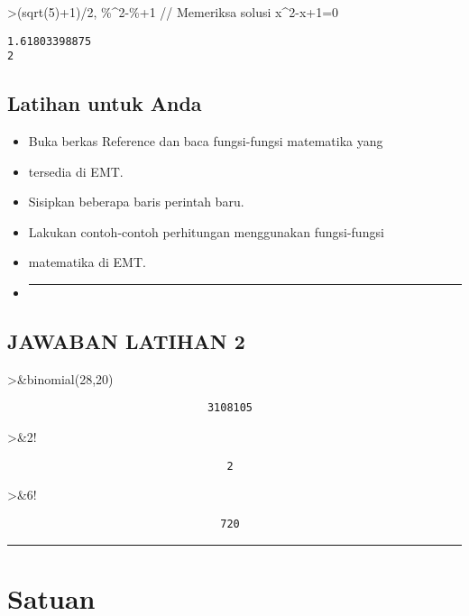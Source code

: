 \documentclass[
]{book}
\begin{document}
\textgreater(sqrt(5)+1)/2, \%\^{}2-\%+1 // Memeriksa solusi x\^{}2-x+1=0

\begin{verbatim}
1.61803398875
2
\end{verbatim}

\section{Latihan untuk Anda}\label{latihan-untuk-anda-1}

\begin{itemize}
\item
  Buka berkas Reference dan baca fungsi-fungsi matematika yang
\item
  tersedia di EMT.
\item
  Sisipkan beberapa baris perintah baru.
\item
  Lakukan contoh-contoh perhitungan menggunakan fungsi-fungsi
\item
  matematika di EMT.
\item
  \begin{center}\rule{0.5\linewidth}{0.5pt}\end{center}
\end{itemize}

\section{JAWABAN LATIHAN 2}\label{jawaban-latihan-2}

\textgreater\&binomial(28,20)

\begin{verbatim}
                               3108105
\end{verbatim}

\textgreater\&2!

\begin{verbatim}
                                  2
\end{verbatim}

\textgreater\&6!

\begin{verbatim}
                                 720
\end{verbatim}

\begin{center}\rule{0.5\linewidth}{0.5pt}\end{center}

\chapter{Satuan}\label{satuan}
\end{document}
